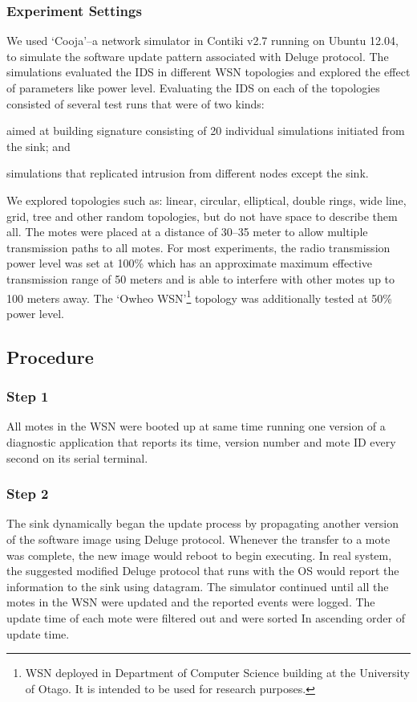 \documentclass[conference]{IEEEtran}
\begin{document}
\subsubsection*{Experiment Settings}
\label{subsec:sim_env} 
We used `Cooja'--a%
 network simulator in Contiki v2.7 running on Ubuntu 12.04, to simulate the software update pattern associated with Deluge protocol.
The simulations evaluated the IDS in different WSN topologies and explored the effect of parameters like power level.
Evaluating the IDS on each of the topologies consisted of several test runs that  were of two kinds: 
\begin{inparaenum}
\item aimed at building signature consisting of 20 individual simulations initiated from the sink; and
\item simulations that replicated intrusion from different nodes except the sink.
\end{inparaenum}
We explored topologies such as: linear, circular, elliptical, double rings, wide line, grid, tree and other random topologies, but do not have space to describe them all.
The motes were placed at a distance of 30--35 meter to allow  multiple transmission paths to all motes. 
For most experiments, the radio transmission power level was set at 100\% which has an approximate maximum effective transmission range of 50 meters and is able to interfere with other motes up to 100 meters away.
The `Owheo WSN'\footnote{WSN deployed in Department of Computer Science building at the University of Otago. It is intended to be used for research purposes.} topology was additionally tested at 50\% power level.%

\subsection*{Procedure}
\label{subsec:proc}

\subsubsection*{Step 1} 
All motes in the WSN were booted up at same time running one version of a diagnostic application that reports its time, version number and mote ID every second on its serial terminal. 

\subsubsection*{Step 2} 
The sink dynamically began the update process by propagating another version of the software image using Deluge protocol. %
Whenever the transfer to a mote was complete, the new image would  reboot to begin executing.
In real system, the suggested modified Deluge protocol that runs with the OS would report the information to the sink using datagram.
The simulator continued until all the motes in the WSN were updated and the reported events were logged. 
The update time of each mote were filtered out  and were sorted In ascending order of update time.
\end{document}
